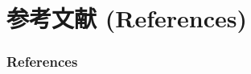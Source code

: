 \section{参考文献 (References)}


\begin{frame}[allowframebreaks]
    \frametitle{References}
    
\end{frame}

